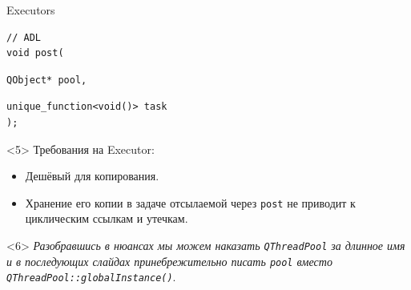 \documentclass[aspectratio=169,hyperref={unicode},17pt]{beamer}
\begin{document}
\begin{frame}[fragile,t]{Executors}
\begin{onlyenv}
\begin{lstlisting}[style=cppcode,aboveskip=0pt,belowskip=0pt]
// ADL
void post(
\end{lstlisting}
\begin{lstlisting}[style=cppcode,backgroundcolor=\color{gray!30},aboveskip=0pt,belowskip=0pt]
  QObject* pool,
\end{lstlisting}
\begin{lstlisting}[style=cppcode,aboveskip=0pt,belowskip=0pt]
  unique_function<void()> task
);
\end{lstlisting}
\end{onlyenv}
\begin{onlyenv}<5>
Требования на Executor:
\begin{itemize}
 \item Дешёвый для копирования.
 \item Хранение его копии в задаче отсылаемой через \texttt{post} не приводит к циклическим ссылкам и утечкам.
\end{itemize}
\end{onlyenv}
\begin{onlyenv}<6>
\textit{\footnotesize{Разобравшись в нюансах мы можем наказать \texttt{QThreadPool} за длинное имя и в последующих слайдах принебрежительно писать \texttt{pool} вместо \texttt{QThreadPool::globalInstance()}}}.
\end{onlyenv}
\end{frame}
\end{document}
